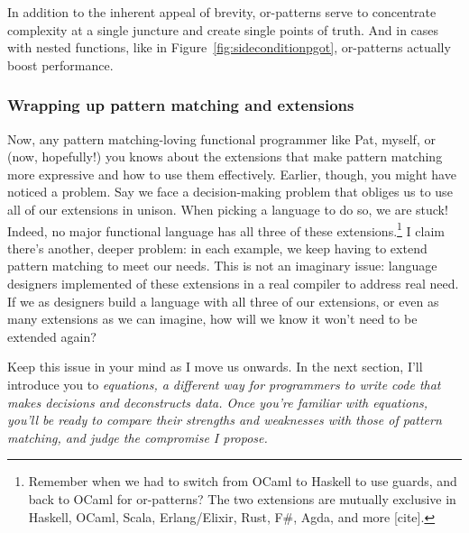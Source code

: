 \documentclass[manuscript,screen,review, 12pt]{acmart}
\begin{document}
    In addition to the inherent appeal of brevity, or-patterns serve to
    concentrate complexity at a single juncture and create single points of
    truth. And in cases with nested functions, like in
    Figure~\ref{fig:sideconditionpgot}, or-patterns actually boost performance.
    
    
    \subsubsection{Wrapping up pattern matching and extensions}
    Now, any pattern matching-loving functional programmer like Pat, myself, or
    (now, hopefully!) you knows about the extensions that make pattern matching
    more expressive and how to use them effectively. Earlier, though, you might
    have noticed a problem. Say we face a decision-making problem that obliges
    us to use all of our extensions in unison. When picking a language to do so,
    we are stuck! Indeed, no major functional language has all three of these
    extensions.\footnote{Remember when we had to switch from OCaml to Haskell to
    use guards, and back to OCaml for or-patterns? The two extensions are
    mutually exclusive in Haskell, OCaml, Scala, Erlang/Elixir, Rust, F\#, Agda,
    and more [cite].} I claim there's another, deeper problem: in each example,
    we keep having to extend pattern matching to meet our needs. This is not an
    imaginary issue: language designers implemented of these extensions in a
    real compiler to address real need. If we as designers build a language with
    all three of our extensions, or even as many extensions as we can imagine,
    how will we know it won't need to be extended again? 


    Keep this issue in your mind as I move us onwards. In the next section, I'll
    introduce you to \it{equations}, a different way for programmers to write
    code that makes decisions and deconstructs data. Once you're familiar with
    equations, you'll be ready to compare their strengths and weaknesses with
    those of pattern matching, and judge the compromise I propose.
    
\end{document}
